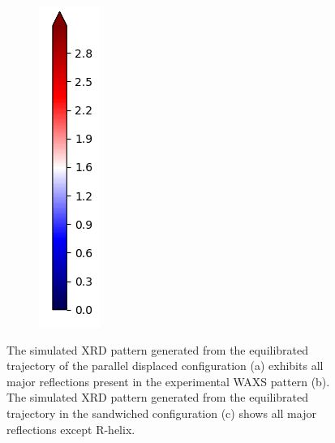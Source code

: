 \documentclass[journal=jpcbfk,manusciprt=article]{achemso}
\begin{document}
\begin{figure}
\begin{subfigure}{0.0544\linewidth}
        \includegraphics[width=\linewidth]{colorbar_seismic.png}
  \end{subfigure}
  \caption{The simulated XRD pattern generated from the equilibrated trajectory
	  of the parallel displaced configuration (a) exhibits all major reflections
	  present in the experimental WAXS pattern (b). The simulated XRD pattern
	  generated from the equilibrated trajectory in the sandwiched configuration (c) shows
	  all major reflections except R-helix.}
  \label{fig:XRDsim}
  \end{figure}
\end{document}
